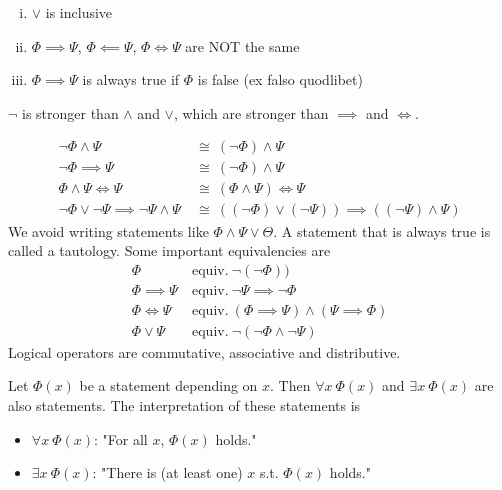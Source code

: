 \documentclass[../../script.tex]{subfiles}
\begin{document}
\begin{rem}\leavevmode
\begin{enumerate}[(i)]
	\item $\vee$ is inclusive
	\item $\Phi \implies \Psi$, $\Phi \impliedby \Psi$, $\Phi \iff \Psi$ are NOT the same
	\item $\Phi \implies \Psi$ is always true if $\Phi$ is false (ex falso quodlibet)
\end{enumerate}
\end{rem}

\begin{defi}
$\neg$ is stronger than $\wedge$ and $\vee$, which are stronger than $\implies$ and $\iff$.
\end{defi}

\begin{eg}\leavevmode
\begin{align*}
	\neg\Phi \wedge \Psi ~&\cong~ (\neg\Phi) \wedge \Psi \\
	\neg\Phi \implies \Psi ~&\cong~ (\neg\Phi) \wedge \Psi \\
	\Phi \wedge \Psi \iff \Psi ~&\cong~ (\Phi \wedge \Psi) \iff \Psi \\
	\neg\Phi \vee \neg\Psi \implies \neg\Psi \wedge \Psi ~&\cong~ ((\neg\Phi) \vee (\neg\Psi)) \implies ((\neg\Psi) \wedge \Psi)
\end{align*}
We avoid writing statements like $\Phi \wedge \Psi \vee \Theta$. A statement that is always true is called a tautology. Some important equivalencies are
\begin{align*}
	\Phi ~&\text{equiv.}~ \neg(\neg\Phi)) \\
	\Phi \implies \Psi ~&\text{equiv.}~ \neg\Psi \implies \neg\Phi \\
	\Phi \iff \Psi ~&\text{equiv.}~ (\Phi \implies \Psi) \wedge (\Psi \implies \Phi) \\
	\Phi \vee \Psi ~&\text{equiv.}~ \neg(\neg\Phi \wedge \neg\Psi)
\end{align*}
Logical operators are commutative, associative and distributive. 
\end{eg}

\begin{defi}[Quantifiers]
Let $\Phi(x)$ be a statement depending on $x$. Then $\forall x ~\Phi(x)$ and $\exists x ~\Phi(x)$ are also statements. The interpretation of these statements is
\begin{itemize}
	\item $\forall x ~\Phi(x)$: "For all $x$, $\Phi(x)$ holds."
	\item $\exists x ~\Phi(x)$: "There is (at least one) $x$ s.t. $\Phi(x)$ holds."
\end{itemize}
\end{defi}
\end{document}
